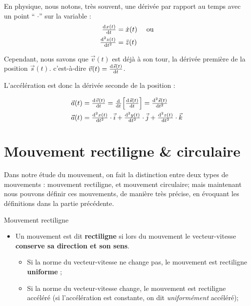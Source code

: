 \documentclass[11pt,a4paper]{article}
\begin{document}
\begingroup
\begin{table}
\begin{rmrq}
En physique, nous notons, très souvent, une dérivée par rapport au temps avec un point `` $\cdot$''  sur la variable  : 
\begin{align*}
    \od{x(t)}{t} &= \dot{x}(t) \quad \text{ ou} \\
    \od[2]{z(t)}{t} &= \Ddot{z}(t)
\end{align*}
\end{rmrq}
\end{table}  

Cependant, nous savons que $\vec{v}(t)$ est déjà à son tour, la dérivée première de la position $\vec{s}(t)$. c'est-à-dire $\vec{v}(t) = \od{\vec{s}(t)}{t}$. 

L'accélération est donc la dérivée seconde de la position : 

\begin{align*}
    \Vec{a}(t) &= \od{\Vec{v}(t)}{t} = \od{ }{t}\Big[ \od{\vec{s}(t)}{t} \Big] = \od[2]{\vec{s}(t)}{t}\\
    \Vec{a}(t) &= \od[2]{x(t)}{t}\cdot \Vec{i} + \od[2]{y(t)}{t}\cdot \Vec{j} + \od[2]{z(t)}{t}\cdot \Vec{k} \\
\end{align*}
\endgroup

\section{Mouvement rectiligne \& circulaire}

Dans notre étude du mouvement, on fait la distinction entre deux types de mouvements : mouvement rectiligne, et mouvement circulaire; mais maintenant nous pouvons définir ces mouvements, de manière très précise, en évoquant les définitions dans la partie précédente. 
\begin{defn}{Mouvement rectiligne }
\begin{itemize}
    \item Un mouvement est dit \textbf{rectiligne} si lors du mouvement le vecteur-vitesse \textbf{conserve sa direction et son sens}. 
    \begin{itemize}
        \item Si la norme du vecteur-vitesse ne change pas, le mouvement est rectiligne \textbf{uniforme} ;
        \item Si la norme du vecteur-vitesse change, le mouvement est rectiligne accéléré (si l'accélération est constante, on dit \textit{uniformément} accéléré);
    \end{itemize}
\end{itemize}
\end{defn}
\end{document}
